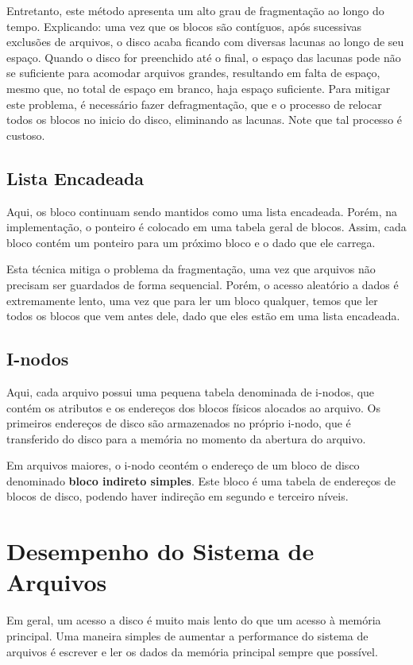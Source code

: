 Entretanto, este método apresenta um alto grau de fragmentação ao longo do tempo. Explicando: uma vez que os blocos são contíguos, após sucessivas exclusões de arquivos, o disco acaba ficando com diversas lacunas ao longo de seu espaço. Quando o disco for preenchido até o final, o espaço das lacunas pode não se suficiente para acomodar arquivos grandes, resultando em falta de espaço, mesmo que, no total de espaço em branco, haja espaço suficiente. Para mitigar este problema, é necessário fazer defragmentação, que e o processo de relocar todos os blocos no inicio do disco, eliminando as lacunas. Note que tal processo é custoso.



\subsection{Lista Encadeada}
Aqui, os bloco continuam sendo mantidos como uma lista encadeada. Porém, na implementação, o ponteiro é colocado em uma tabela geral de blocos. Assim, cada bloco contém um ponteiro para um próximo bloco e o dado que ele carrega.

Esta técnica mitiga o problema da fragmentação, uma vez que arquivos não precisam ser guardados de forma sequencial. Porém, o acesso aleatório a dados é extremamente lento, uma vez que para ler um bloco qualquer, temos que ler todos os blocos que vem antes dele, dado que eles estão em uma lista encadeada.



\subsection{I-nodos}
Aqui, cada arquivo possui uma pequena tabela denominada de i-nodos, que contém os atributos e os endereços dos blocos físicos alocados ao arquivo. Os primeiros endereços de disco são armazenados no próprio i-nodo, que é transferido do disco para a memória no momento da abertura do arquivo.

Em arquivos maiores, o i-nodo ceontém o endereço de um bloco de disco denominado \textbf{bloco indireto simples}. Este bloco é uma tabela de endereços de blocos de disco, podendo haver indireção em segundo e terceiro níveis.









\section{Desempenho do Sistema de Arquivos}
Em geral, um acesso a disco é muito mais lento do que um acesso à memória principal. Uma maneira simples de aumentar a performance do sistema de arquivos é escrever e ler os dados da memória principal sempre que possível.

